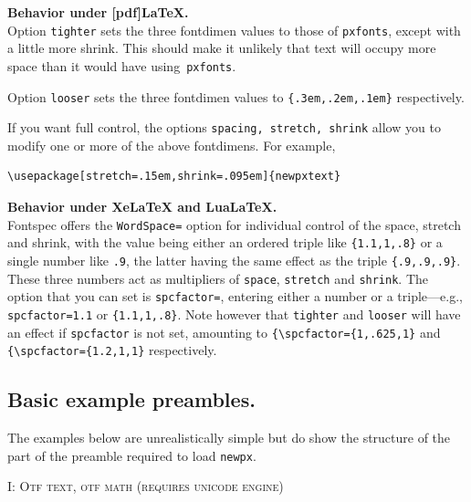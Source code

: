\documentclass[11pt]{article}
\theoremstyle{oldplain}
\theoremstyle{plain}
\begin{document}
\textbf{Behavior under [pdf]LaTeX.}\\
Option {\tt tighter} sets the three fontdimen values to those of {\tt pxfonts}, except with a little more shrink. This should make it unlikely that text will occupy more space than it would have using~{\tt pxfonts}. 

Option {\tt looser} sets the three fontdimen values to \verb|{.3em,.2em,.1em}| respectively. 

If you want full control, the options {\tt spacing, stretch, shrink} allow you to modify one or more of the above fontdimens. For example,
\begin{verbatim}
\usepackage[stretch=.15em,shrink=.095em]{newpxtext}
\end{verbatim}
\textbf{Behavior under XeLaTeX and LuaLaTeX.}\\
Fontspec  offers the {\tt WordSpace=} option for individual control of the space, stretch and shrink, with the value being either an ordered triple like \verb|{1.1,1,.8}| or a single number like {\tt .9}, the latter having the same effect as the triple \verb|{.9,.9,.9}|. These three numbers act as multipliers of {\tt space}, {\tt stretch} and {\tt shrink}. The option that you can set is {\tt spcfactor=}, entering either a number or a triple---e.g., {\tt spcfactor=1.1} or \verb|{1.1,1,.8}|. Note however that {\tt tighter} and {\tt looser} will have an effect if {\tt spcfactor} is not set, amounting to \verb|{\spcfactor={1,.625,1}| and \verb|{\spcfactor={1.2,1,1}| respectively.

\subsection{Basic example preambles.}

The examples below are unrealistically simple but do show the structure of the part of the preamble required to load {\tt newpx}.

\textsc{I: Otf text, otf math (requires unicode engine)}
\end{document}
